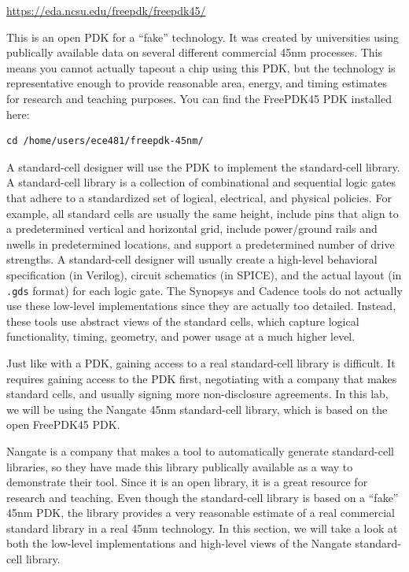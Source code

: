 \documentclass[a4paper,12pt,twoside]{article}
\begin{document}
\url{https://eda.ncsu.edu/freepdk/freepdk45/}

This is an open PDK for a “fake” technology. It was created by universities using publically available data on several different commercial 45nm processes. This means you cannot actually tapeout a chip using this PDK, but the technology is representative enough to provide reasonable area, energy, and timing estimates for research and teaching purposes. You can find the FreePDK45 PDK installed here:
\begin{verbatim}
cd /home/users/ece481/freepdk-45nm/
\end{verbatim}
A standard-cell designer will use the PDK to implement the standard-cell library. A standard-cell library is a collection of combinational and sequential logic gates that adhere to a standardized set of logical, electrical, and physical policies. For example, all standard cells are usually the same height, include pins that align to a predetermined vertical and horizontal grid, include power/ground rails and nwells in predetermined locations, and support a predetermined number of drive strengths. A standard-cell designer will usually create a high-level behavioral specification (in Verilog), circuit schematics (in SPICE), and the actual layout (in \texttt{.gds} format) for each logic gate. The Synopsys and Cadence tools do not actually use these low-level implementations since they are actually too detailed. Instead, these tools use abstract views of the standard cells, which capture logical functionality, timing, geometry, and power usage at a much higher level.

Just like with a PDK, gaining access to a real standard-cell library is difficult. It requires gaining access to the PDK first, negotiating with a company that makes standard cells, and usually signing more non-disclosure agreements. In this lab, we will be using the Nangate 45nm standard-cell library, which is based on the open FreePDK45 PDK.

Nangate is a company that makes a tool to automatically generate standard-cell libraries, so they have made this library publically available as a way to demonstrate their tool. Since it is an open library, it is a great resource for research and teaching. Even though the standard-cell library is based on a “fake” 45nm PDK, the library provides a very reasonable estimate of a real commercial standard library in a real 45nm technology. In this section, we will take a look at both the low-level implementations and high-level views of the Nangate standard-cell library.
\end{document}
